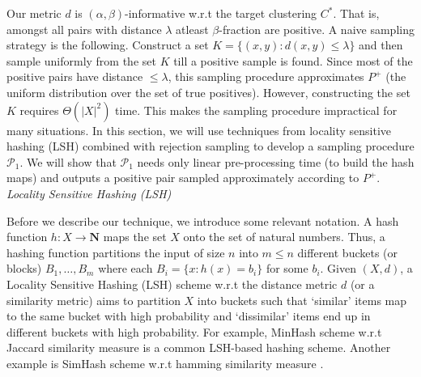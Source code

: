 \documentclass[12pt]{article}
\newcommand{\mb}{\mathbf}
\newcommand{\mc}{\mathcal}
\begin{document}
Our metric $d$ is $(\alpha, \beta)$-informative w.r.t the target clustering $C^*$. That is, amongst all pairs with distance $\lambda$ atleast $\beta$-fraction are positive. A naive sampling strategy is the following. Construct a set $K = \{(x, y): d(x, y) \le \lambda\}$ and then sample uniformly from the set $K$ till a positive sample is found. Since most of the positive pairs have distance $\le \lambda$, this sampling procedure approximates $P^+$ (the uniform distribution over the set of true positives). However, constructing the set $K$ requires $\Theta(|X|^2)$ time. This makes the sampling procedure impractical for many situations. In this section, we will use techniques from locality sensitive hashing (LSH) combined with rejection sampling to develop a sampling procedure $\mc P_1$. We will show that $\mc P_1$ needs only linear pre-processing time (to build the hash maps) and outputs a positive pair sampled approximately according to $P^+$.\\

\noindent\textit{Locality Sensitive Hashing (LSH)}

\vspace{0.02in}\noindent Before we describe our technique, we introduce some relevant notation. A hash function $h: X \rightarrow \mb N$ maps the set $X$ onto the set of natural numbers. Thus, a hashing function partitions the input of size $n$ into $m \le n$ different buckets (or blocks) $B_1, \ldots, B_m$ where each $B_i = \{x : h(x) = b_i\}$ for some $b_i$. Given $(X, d)$, a Locality Sensitive Hashing (LSH) scheme w.r.t the distance metric $d$ (or a similarity metric) aims to partition $X$ into buckets such that `similar' items map to the same bucket with high probability and `dissimilar' items end up in different buckets with high probability. For example, MinHash scheme w.r.t Jaccard similarity measure \cite{broder2000min, broder1997resemblance} is a common LSH-based hashing scheme. Another example is SimHash scheme w.r.t hamming similarity measure \cite{charikar2002similarity}. 
\end{document}

